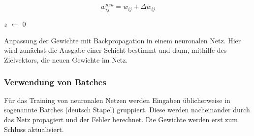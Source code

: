 \begin{equation}
    w_{ij}^{neu} = w_{ij} + \Delta w_{ij}
\end{equation}

\IncMargin{1em}
\begin{algorithm}[htb]


    \BlankLine
    $z$ $\leftarrow$ 0\\
    \BlankLine

    \caption{Anpassung der Gewichte mit Backpropagation in einem neuronalen Netz. Hier wird zunächst die Ausgabe einer Schicht bestimmt und dann, mithilfe des Zielvektors, die neuen Gewichte im Netz. \cite[S. 316]{ertelNeuronaleNetze2021}}
    \label{algo:backprop}
\end{algorithm}
\DecMargin{1em}

\pagebreak

\subsubsection{Verwendung von Batches}
Für das Training von neuronalen Netzen werden Eingaben üblicherweise in sogenannte Batches (deutsch Stapel) gruppiert. Diese werden nacheinander durch das Netz propagiert und der Fehler berechnet. Die Gewichte werden erst zum Schluss aktualisiert.


